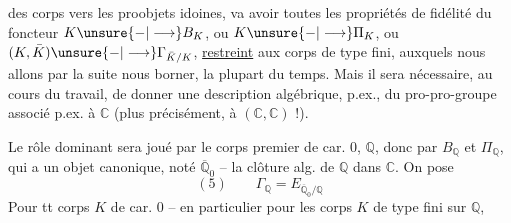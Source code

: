 des corps vers les proobjets idoines, va avoir toutes les propriétés de fidélité du foncteur $K\unsure{-|\longrightarrow}B_K$, ou $K\unsure{-|\longrightarrow}\Pi_K$, ou $(K,\bar K)\unsure{-|\longrightarrow}\Gamma_{\bar K/K}$, \uline{restreint} aux corps  de type fini, auxquels nous allons par la suite nous borner, la plupart du temps. Mais il sera nécessaire, au cours du travail, de donner une description  algébrique, p.ex., du pro-pro-groupe  associé p.ex. à $\mathbb C$ (plus précisément, à $(\mathbb C,\mathbb C)$ !).

Le rôle dominant sera joué par le corps premier de car. $0$, $\mathbb Q$, donc par $B_{\mathbb Q}$ et $\Pi_{\mathbb Q}$, qui a un objet canonique, noté $\overline{\mathbb Q}_0$ -- la clôture alg. de $\mathbb Q$ dans $\mathbb C$. On pose
\[
(5)\qquad \Gamma_{\mathbb Q}=E_{\overline{\mathbb Q}_0/\mathbb Q}
\]
Pour tt corps $K$ de car. $0$ -- en particulier pour les corps $K$ de type fini sur $\mathbb Q$, 
